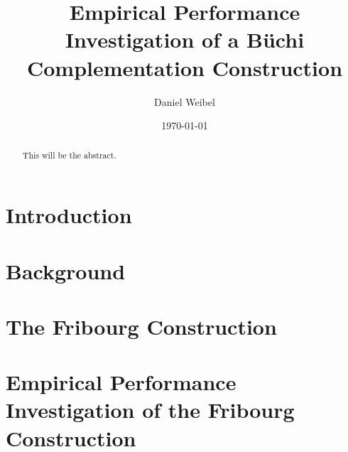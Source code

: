 \documentclass[a4paper,table]{report}
\title{Empirical Performance Investigation of a Büchi\\Complementation Construction}
\author{Daniel Weibel}
\date{\today}
\begin{document}
\maketitle


\begin{abstract}
This will be the abstract.
\end{abstract}

\renewcommand{\abstractname}{Acknowledgements}
\begin{abstract}
\end{abstract}

\dominitoc
\tableofcontents

\chapter{Introduction}
\label{chap_intro}
\newpage


\chapter{Background}
\label{chap_background}
\minitoc
\newpage


\chapter{The Fribourg Construction}
\label{chap_construction}
\minitoc
\newpage


\chapter{Empirical Performance Investigation of the Fribourg Construction}
\label{chap_investigation}
\minitoc
\newpage

\end{document}
